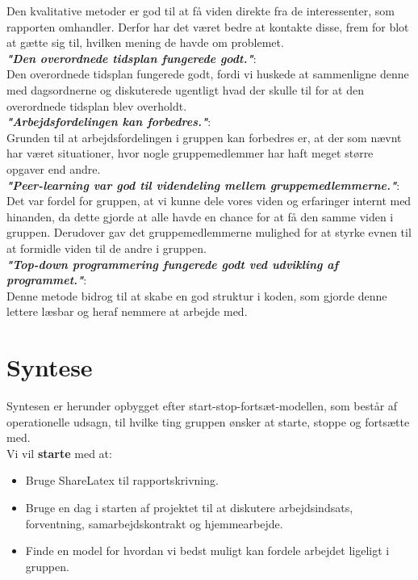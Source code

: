 \documentclass[oneside,a4paper,titlepage]{article}
\begin{document}
Den kvalitative metoder er god til at få viden direkte fra de interessenter, som rapporten omhandler. Derfor har det været bedre at kontakte disse, frem for blot at gætte sig til, hvilken mening de havde om problemet. \\

\textbf{\textit{"Den overordnede tidsplan fungerede godt."}}: \\

Den overordnede tidsplan fungerede godt, fordi vi huskede at sammenligne denne med dagsordnerne og diskuterede ugentligt hvad der skulle til for at den overordnede tidsplan blev overholdt.  \\

\textbf{\textit{"Arbejdsfordelingen kan forbedres."}}: \\

Grunden til at arbejdsfordelingen i gruppen kan forbedres er, at der som nævnt har været situationer, hvor nogle gruppemedlemmer har haft meget større opgaver end andre.  \\

\textbf{\textit{"Peer-learning var god til videndeling mellem gruppemedlemmerne."}}: \\

Det var fordel for gruppen, at vi kunne dele vores viden og erfaringer internt med hinanden, da dette gjorde at alle havde en chance for at få den samme viden i gruppen. Derudover gav det gruppemedlemmerne mulighed for at styrke evnen til at formidle viden til de andre i gruppen. \\

\textbf{\textit{"Top-down programmering fungerede godt ved udvikling af programmet."}}: \\

Denne metode bidrog til at skabe en god struktur i koden, som gjorde denne lettere læsbar og heraf nemmere at arbejde med.


\section{Syntese}
Syntesen er herunder opbygget efter start-stop-fortsæt-modellen, som består af operationelle udsagn, til hvilke ting gruppen ønsker at starte, stoppe og fortsætte med.\\

Vi vil \textbf{starte} med at:
\begin{itemize}
  \item Bruge ShareLatex til rapportskrivning. 
  \item Bruge en dag i starten af projektet til at diskutere arbejdsindsats, forventning, samarbejdskontrakt og hjemmearbejde. 
  \item Finde en model for hvordan vi bedst muligt kan fordele arbejdet ligeligt i gruppen.  
\end{itemize}
\end{document}
